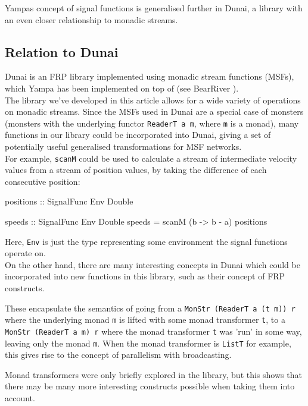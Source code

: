 Yampas concept of signal functions is generalised further in Dunai, a library with an even closer relationship to monadic streams.

\subsection{Relation to Dunai}

Dunai \cite{frp_refactored}\cite{dunai} is an FRP library implemented using monadic stream functions (MSFs), which Yampa has been implemented on top of (see BearRiver \cite{bearriver}). \\

The library we've developed in this article allows for a wide variety of operations on monadic streams. Since the MSFs used in Dunai are a special case of monsters (monsters with the underlying functor \verb+ReaderT a m+, where \verb+m+ is a monad), many functions in our library could be incorporated into Dunai, giving a set of potentially useful generalised transformations for MSF networks. \\

For example, \verb+scanM+ could be used to calculate a stream of intermediate velocity values from a stream of position values, by taking the difference of each consecutive position:
\begin{haskell}
positions :: SignalFunc Env Double 

speeds :: SignalFunc Env Double 
speeds = scanM (\a b -> b - a) positions
\end{haskell}

Here, \verb+Env+ is just the type representing some environment the signal functions operate on. \\

On the other hand, there are many interesting concepts in Dunai which could be incorporated into new functions in this library, such as their concept of FRP constructs. 

These encapsulate the semantics of going from a \verb+MonStr (ReaderT a (t m)) r+ where the underlying monad \verb+m+ is lifted with some monad transformer \verb+t+, to a \verb+MonStr (ReaderT a m) r+ where the monad transformer \verb+t+ was 'run' in some way, leaving only the monad \verb+m+. When the monad transformer is \verb+ListT+ for example, this gives rise to the concept of parallelism with broadcasting. 

Monad transformers were only briefly explored in the library, but this shows that there may be many more interesting constructs possible when taking them into account. \\

